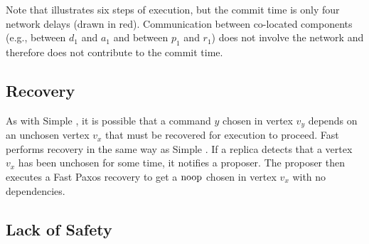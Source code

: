 Note that  illustrates six steps of execution, but the
commit time is only four network delays (drawn in red). Communication between
co-located components (e.g., between $d_1$ and $a_1$ and between $p_1$ and
$r_1$) does not involve the network and therefore does not contribute to the
commit time.

\subsection{Recovery}
As with Simple \BPaxos{}, it is possible that a command $y$ chosen in vertex
$v_y$ depends on an unchosen vertex $v_x$ that must be recovered for execution
to proceed. Fast \BPaxos{} performs recovery in the same way as Simple
\BPaxos{}. If a replica detects that a vertex $v_x$ has been unchosen for some
time, it notifies a proposer. The proposer then executes a Fast Paxos recovery
to get a $\text{noop}{}$ chosen in vertex $v_x$ with no dependencies.

\subsection{Lack of Safety}
{}

